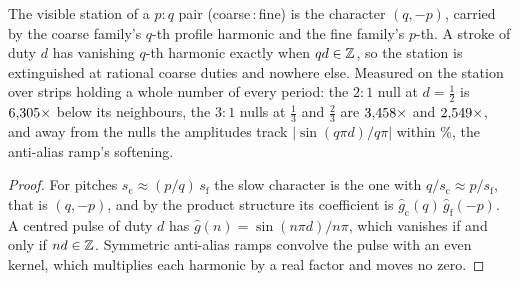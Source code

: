 \begin{theorem}
\label{thm:dutynull}
The visible station of a $p{:}q$ pair (coarse\,:\,fine) is the character
$(q,-p)$, carried by the coarse family's $q$-th profile harmonic and the fine
family's $p$-th. A stroke of duty $d$ has vanishing $q$-th harmonic exactly when
$qd\in\mathbb{Z}$, so the station is extinguished at rational coarse duties and
nowhere else. Measured on the station over strips holding a whole number of
every period: the $2{:}1$ null at $d=\tfrac12$ is $6{,}305\times$ below
its neighbours, the $3{:}1$ nulls at $\tfrac13$ and $\tfrac23$ are
$3{,}458\times$ and $2{,}549\times$, and away from
the nulls the amplitudes track $|\sin(q\pi d)/q\pi|$ within \dutyNullLawPct\%,
the anti-alias ramp's softening.
\end{theorem}

\begin{proof}
For pitches $s_{\mathrm c}\approx(p/q)\,s_{\mathrm f}$ the slow character is
the one with $q/s_{\mathrm c}\approx p/s_{\mathrm f}$, that is $(q,-p)$, and by
the product structure its coefficient is
$\hat g_{\mathrm c}(q)\,\hat g_{\mathrm f}(-p)$. A centred pulse of duty $d$ has
$\hat g(n)=\sin(n\pi d)/n\pi$, which vanishes if and only if $nd\in\mathbb{Z}$.
Symmetric anti-alias ramps convolve the pulse with an even kernel, which
multiplies each harmonic by a real factor and moves no zero.
\end{proof}

